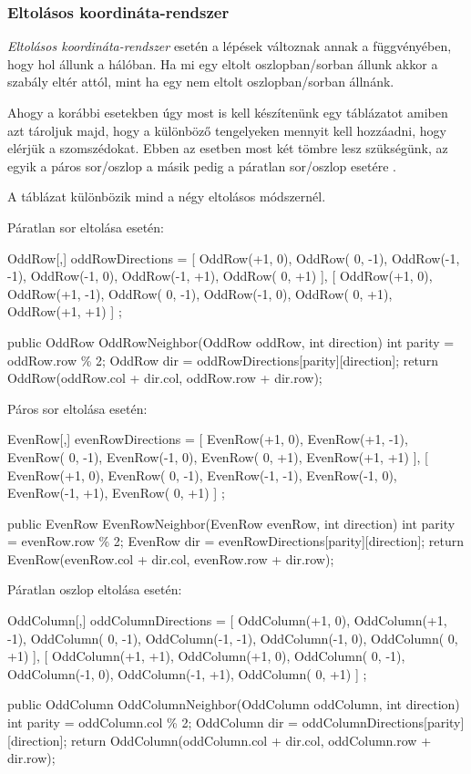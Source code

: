 \subsubsection{Eltolásos koordináta-rendszer}

\textit{Eltolásos koordináta-rendszer} esetén a lépések változnak annak a függvényében, hogy hol állunk a hálóban. Ha mi egy eltolt oszlopban/sorban állunk akkor a szabály eltér attól, mint ha egy nem eltolt oszlopban/sorban állnánk.

Ahogy a korábbi esetekben úgy most is kell készítenünk egy táblázatot amiben azt tároljuk majd, hogy a különböző tengelyeken mennyit kell hozzáadni, hogy elérjük a szomszédokat. Ebben az esetben most két tömbre lesz szükségünk, az egyik a páros sor/oszlop a másik pedig a páratlan sor/oszlop esetére \cite{Neighbors_Offset}.

A táblázat különbözik mind a négy eltolásos módszernél.

\bigskip

Páratlan sor eltolása esetén:
\begin{cpp}
OddRow[,] oddRowDirections = 
{ 
   [ 
      OddRow(+1,  0), OddRow( 0, -1), OddRow(-1, -1),
      OddRow(-1,  0), OddRow(-1, +1), OddRow( 0, +1) 
   ],
   [ 
      OddRow(+1,  0), OddRow(+1, -1), OddRow( 0, -1),
      OddRow(-1,  0), OddRow( 0, +1), OddRow(+1, +1) 
   ]
};

public OddRow OddRowNeighbor(OddRow oddRow, int direction)
{
   int parity = oddRow.row \% 2;
   OddRow dir = oddRowDirections[parity][direction];
   return OddRow(oddRow.col + dir.col, oddRow.row + dir.row);
}   
\end{cpp}

Páros sor eltolása esetén:
\begin{cpp}  
EvenRow[,] evenRowDirections = 
{ 
   [
      EvenRow(+1,  0), EvenRow(+1, -1), EvenRow( 0, -1),
      EvenRow(-1,  0), EvenRow( 0, +1), EvenRow(+1, +1) 
   ],
   [ 
      EvenRow(+1,  0), EvenRow( 0, -1), EvenRow(-1, -1),
      EvenRow(-1,  0), EvenRow(-1, +1), EvenRow( 0, +1) 
   ]
};

public EvenRow EvenRowNeighbor(EvenRow evenRow, int direction)
{
   int parity = evenRow.row \% 2;
   EvenRow dir = evenRowDirections[parity][direction];
   return EvenRow(evenRow.col + dir.col, evenRow.row + dir.row);
}   
\end{cpp}

Páratlan oszlop eltolása esetén:
\begin{cpp}
OddColumn[,] oddColumnDirections = 
{ 
   [ 
      OddColumn(+1,  0), OddColumn(+1, -1), OddColumn( 0, -1),
      OddColumn(-1, -1), OddColumn(-1,  0), OddColumn( 0, +1) 
   ],
   [ 
      OddColumn(+1, +1), OddColumn(+1,  0), OddColumn( 0, -1),
      OddColumn(-1,  0), OddColumn(-1, +1), OddColumn( 0, +1) 
   ]
};

public OddColumn OddColumnNeighbor(OddColumn oddColumn, int direction)
{
   int parity = oddColumn.col \% 2;
   OddColumn dir = oddColumnDirections[parity][direction];
   return OddColumn(oddColumn.col + dir.col, oddColumn.row + dir.row);
}   
\end{cpp}

